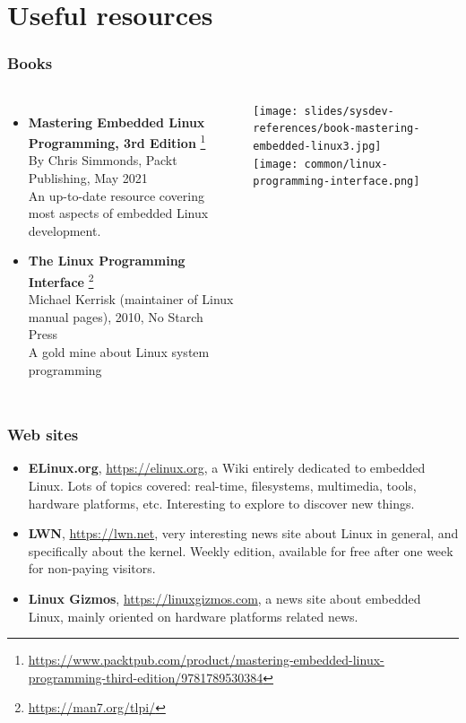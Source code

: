 \section{Useful resources}

\begin{frame}
  \frametitle{Books}
  \begin{columns}[T]
    \small
    \begin{itemize}
    \item {\bf Mastering Embedded Linux Programming, 3rd Edition}
      \footnote{\tiny
\url{https://www.packtpub.com/product/mastering-embedded-linux-programming-third-edition/9781789530384}}\\
      By Chris Simmonds, Packt Publishing, May 2021\\
      An up-to-date resource covering most aspects of embedded Linux
      development.
    \item {\bf The Linux Programming Interface}
      \footnote{\tiny \url{https://man7.org/tlpi/}}\\
      Michael Kerrisk (maintainer of Linux manual pages), 2010, No Starch Press\\
      A gold mine about Linux system programming\\
    \end{itemize}
    \normalsize
    \texttt{[image: slides/sysdev-references/book-mastering-embedded-linux3.jpg]}\\
    \vspace{0.5cm}
    \texttt{[image: common/linux-programming-interface.png]}\\
  \end{columns}
\end{frame}

\begin{frame}
  \frametitle{Web sites}
  \begin{itemize}
  \item {\bf ELinux.org}, \url{https://elinux.org}, a Wiki entirely
    dedicated to embedded Linux. Lots of topics covered: real-time,
    filesystems, multimedia, tools, hardware platforms,
    etc. Interesting to explore to discover new things.
  \item {\bf LWN}, \url{https://lwn.net}, very interesting news site
    about Linux in general, and specifically about the kernel. Weekly
    edition, available for free after one week for non-paying
    visitors.
  \item {\bf Linux Gizmos}, \url{https://linuxgizmos.com}, a news site
    about embedded Linux, mainly oriented on hardware platforms
    related news.
  \end{itemize}
\end{frame}


